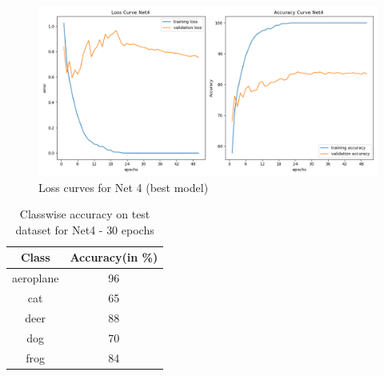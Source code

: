 \documentclass{article}
\begin{document}
\begin{figure}[ht]
	\centering
	\includegraphics[scale=0.35]{../code/images/Net4.png}
	\caption{Loss curves for Net 4 (best model)}
	\label{fig:net4loss}
\end{figure}

\begin{table}[ht]
	\caption{Classwise accuracy on test dataset for Net4 - $30$ epochs}
	\centering
	\begin{tabular}{|c | c|}
		\hline\hline
		Class & Accuracy(in \%) \\ [0.5ex]
		\hline
		 aeroplane & 96 \\
		       cat & 65 \\
		      deer & 88 \\
		       dog & 70 \\
			  frog & 84 \\ [1ex]
		\hline
	\end{tabular}
\end{table}
\end{document}
